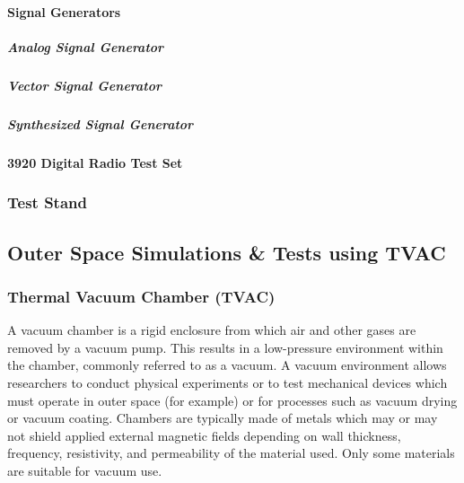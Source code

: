 


\paragraph{Signal Generators}

\subparagraph{Analog Signal Generator}

\subparagraph{Vector Signal Generator}

\subparagraph{Synthesized Signal Generator}

\paragraph{3920 Digital Radio Test Set}




\subsubsection{Test Stand}
\- \vfill
\subsection{Outer Space Simulations \& Tests using TVAC  }

\subsubsection{Thermal Vacuum Chamber (TVAC) }

	A vacuum chamber is a rigid enclosure from which air and other gases are removed by a vacuum pump. This results in a low-pressure environment within the chamber, commonly referred to as a vacuum. A vacuum environment allows researchers to conduct physical experiments or to test mechanical devices which must operate in outer space (for example) or for processes such as vacuum drying or vacuum coating. Chambers are typically made of metals which may or may not shield applied external magnetic fields depending on wall thickness, frequency, resistivity, and permeability of the material used. Only some materials are suitable for vacuum use.

